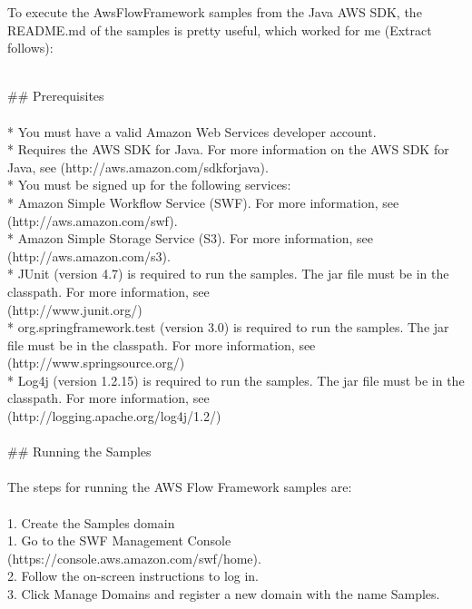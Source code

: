 \documentclass{article}
\begin{document}
To execute the AwsFlowFramework samples from the Java AWS SDK, the README.md of the samples is pretty useful, which worked for me (Extract follows):
\\
\\
\begin{textit}
\#\# Prerequisites 
\\ 
\\ 
*   You must have a valid Amazon Web Services developer account. \\
*   Requires the AWS SDK for Java. For more information on the AWS SDK for Java, see (http\-://\-aws.\-amazon.\-com/\-sdkforjava). \\
*   You must be signed up for the following services: \\
    *   Amazon Simple Workflow Service (SWF). For more information, see \\ 
(http://aws.amazon.com/swf). \\
    *   Amazon Simple Storage Service (S3). For more information, see \\ 
(http://aws.amazon.com/s3). \\
*   JUnit (version 4.7) is required to run the samples. The jar file must be in the classpath. For more information, see \\ 
(http://www.junit.org/) \\
*   org.springframework.test (version 3.0) is required to run the samples. The jar file must be in the classpath. For more information, see \\ 
(http://www.springsource.org/) \\
*   Log4j (version 1.2.15) is required to run the samples. The jar file must be in the classpath. For more information, see \\ 
(http://logging.apache.org/log4j/1.2/) \\ \\

\#\# Running the Samples \\ \\

The steps for running the AWS Flow Framework samples are: \\ \\

1.  Create the Samples domain \\
    1.  Go to the SWF Management Console \\
(https://console.aws.amazon.com/swf/home). \\
    2.  Follow the on-screen instructions to log in. \\
    3.  Click Manage Domains and register a new domain with the name Samples. \\ \\


\end{textit}
\end{document}
